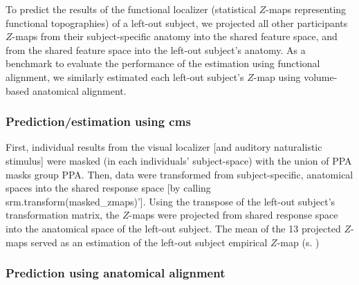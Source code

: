 

%
To predict the results of the functional localizer (statistical $Z$-maps
representing functional topographies) of a left-out subject, we projected all
other participants $Z$-maps from their subject-specific anatomy into the shared
feature space, and from the shared feature space into the left-out subject's
anatomy.
%
As a benchmark to evaluate the performance of the estimation using functional
alignment, we similarly estimated each left-out subject's $Z$-map using
volume-based anatomical alignment.


\subsubsection{Prediction/estimation using \ac{cms}}


%
First, individual results from the visual localizer [and auditory naturalistic
stimulus] were masked (in each individuals' subject-space) with the union of PPA
masks group PPA.
%
Then, data were transformed from subject-specific, anatomical spaces into the
shared response space [by calling srm.transform(masked\_zmaps)'].
%
Using the transpose of the left-out subject's transformation matrix, the
$Z$-maps were projected from shared response space into the anatomical space of
the left-out subject.
%
The mean of the 13 projected $Z$-maps served as an estimation of the left-out
subject empirical $Z$-map (s. \citep{sengupta2016extension})


\subsubsection{Prediction using anatomical alignment}




